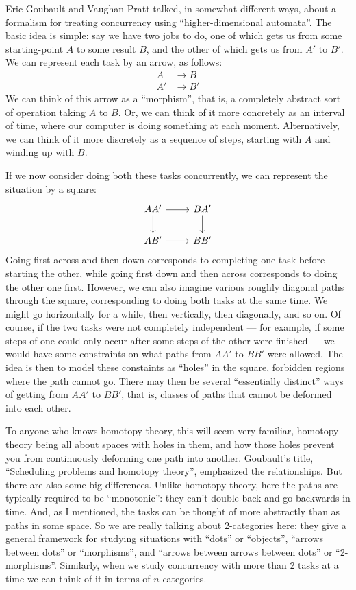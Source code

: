 \documentclass{article}
\begin{document}
Eric Goubault and Vaughan Pratt talked, in somewhat different ways,
about a formalism for treating concurrency using ``higher-dimensional
automata''. The basic idea is simple: say we have two jobs to do, one of
which gets us from some starting-point \(A\) to some result \(B\), and
the other of which gets us from \(A'\) to \(B'\). We can represent each
task by an arrow, as follows: \[
  \begin{aligned}
    A&\longrightarrow B
  \\A'&\longrightarrow B'
  \end{aligned}
\] We can think of this arrow as a ``morphism'', that is, a completely
abstract sort of operation taking \(A\) to \(B\). Or, we can think of it
more concretely as an interval of time, where our computer is doing
something at each moment. Alternatively, we can think of it more
discretely as a sequence of steps, starting with \(A\) and winding up
with \(B\).

If we now consider doing both these tasks concurrently, we can represent
the situation by a square: \[
  \begin{tikzcd}
    AA' \rar\dar & BA' \dar
  \\AB' \rar & BB'
  \end{tikzcd}
\] Going first across and then down corresponds to completing one task
before starting the other, while going first down and then across
corresponds to doing the other one first. However, we can also imagine
various roughly diagonal paths through the square, corresponding to
doing both tasks at the same time. We might go horizontally for a while,
then vertically, then diagonally, and so on. Of course, if the two tasks
were not completely independent --- for example, if some steps of one
could only occur after some steps of the other were finished --- we
would have some constraints on what paths from \(AA'\) to \(BB'\) were
allowed. The idea is then to model these constaints as ``holes'' in the
square, forbidden regions where the path cannot go. There may then be
several ``essentially distinct'' ways of getting from \(AA'\) to
\(BB'\), that is, classes of paths that cannot be deformed into each
other.

To anyone who knows homotopy theory, this will seem very familiar,
homotopy theory being all about spaces with holes in them, and how those
holes prevent you from continuously deforming one path into another.
Goubault's title, ``Scheduling problems and homotopy theory'',
emphasized the relationships. But there are also some big differences.
Unlike homotopy theory, here the paths are typically required to be
``monotonic'': they can't double back and go backwards in time. And, as
I mentioned, the tasks can be thought of more abstractly than as paths
in some space. So we are really talking about 2-categories here: they
give a general framework for studying situations with ``dots'' or
``objects'', ``arrows between dots'' or ``morphisms'', and ``arrows
between arrows between dots'' or ``2-morphisms''. Similarly, when we
study concurrency with more than 2 tasks at a time we can think of it in
terms of \(n\)-categories.
\end{document}
